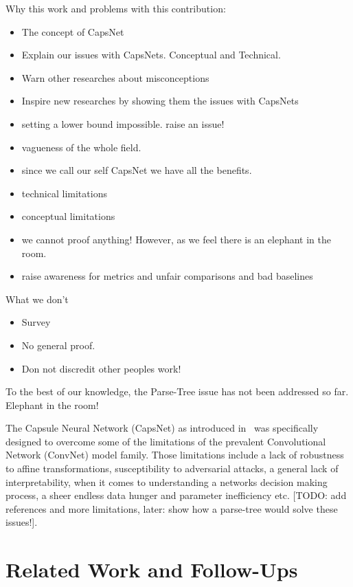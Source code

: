 \documentclass{article}
\begin{document}
Why this work and problems with this contribution:
\begin{itemize}
	\item The concept of CapsNet
	\item Explain our issues with CapsNets. Conceptual and Technical.
	\item Warn other researches about misconceptions
	\item Inspire new researches by showing them the issues with CapsNets
	\item setting a lower bound impossible. raise an issue!
	\item vagueness of the whole field.
	\item since we call our self CapsNet we have all the benefits.
	\item technical limitations
	\item conceptual limitations
	\item we cannot proof anything! However, as we feel there is an elephant in the room.
	\item raise awareness for metrics and unfair comparisons and bad baselines
\end{itemize}

What we don't
\begin{itemize}
	\item Survey
	\item No general proof.
	\item Don not discredit other peoples work!
\end{itemize}

To the best of our knowledge, the Parse-Tree issue has not been addressed so far. Elephant in the room!



The Capsule Neural Network (CapsNet) as introduced in~\cite{nips/SabourFH17} was specifically designed to overcome some of the limitations of the prevalent Convolutional Network (ConvNet) model family.
Those limitations include a lack of robustness to affine transformations, susceptibility to adversarial attacks, a general lack of interpretability, when it comes to understanding a networks decision making process, a sheer endless data hunger and parameter inefficiency etc. [TODO: add references and more limitations, later: show how a parse-tree would solve these issues!].

\section{Related Work and Follow-Ups}
\end{document}
